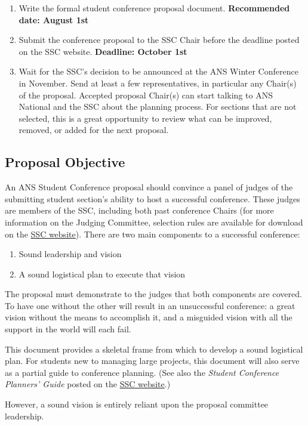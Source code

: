 \documentclass[12pt]{article}
\begin{document}
\begin{enumerate}
\item{Write the formal student conference proposal document. \textbf{Recommended date: August 1st}}
\item{Submit the conference proposal to the SSC Chair before the deadline posted on the SSC website. \textbf{Deadline: October 1st}}
\item{Wait for the SSC’s decision to be announced at the ANS Winter Conference in November. Send at least a few representatives, in particular any Chair(s) of the proposal. Accepted proposal Chair(s) can start talking to ANS National and the SSC about the planning process. For sections that are not selected, this is a great opportunity to review what can be improved, removed, or added for the next proposal.}
\end{enumerate}

\subsection{Proposal Objective}
An ANS Student Conference proposal should convince a panel of judges of the submitting student section’s ability to host a successful conference. These judges are members of the SSC, including both past conference Chairs (for more information on the Judging Committee, selection rules are available for download on the \href{http://students.ans.org/student-conferences/}{SSC website}).
There are two main components to a successful conference:
\begin{enumerate}
\item{Sound leadership and vision}
\item{A sound logistical plan to execute that vision}
\end{enumerate}

The proposal must demonstrate to the judges that both components are covered. To have one without the other will result in an unsuccessful conference: a great vision without the means to accomplish it, and a misguided vision with all the support in the world will each fail.

This document provides a skeletal frame from which to develop a sound logistical plan. For students new to managing large projects, this document will also serve as a partial guide to conference planning. (See also the \textit{Student Conference Planners’ Guide} posted on the \href{http://students.ans.org/student-conferences/}{SSC website}.)

However, a sound vision is entirely reliant upon the proposal committee leadership.
\end{document}
